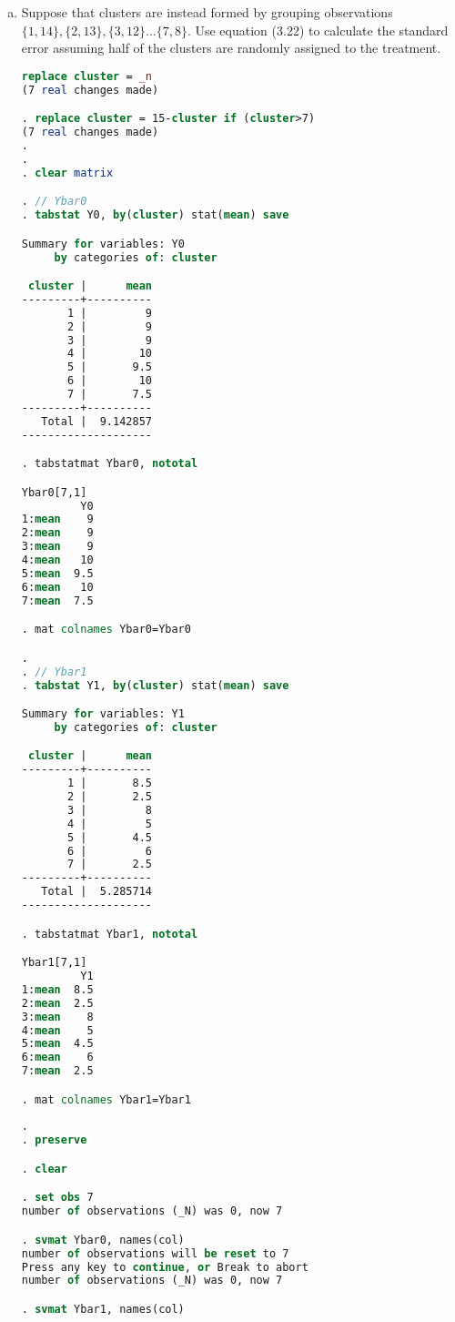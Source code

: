 \documentclass[11pt,notitlepage]{article}\usepackage[]{graphicx}\usepackage[]{color}
\begin{document}
\begin{enumerate}[a)]
\item Suppose that clusters are instead formed by grouping observations $\{1,14\},\{2,13\},\{3,12\}\ldots\{7,8\}$. Use equation (3.22) to calculate the standard error assuming half of the clusters are randomly assigned to the treatment.

\begin{lstlisting}[language=stata]
 replace cluster = _n
(7 real changes made)

. replace cluster = 15-cluster if (cluster>7)
(7 real changes made)
. 
.         
. clear matrix

. // Ybar0        
. tabstat Y0, by(cluster) stat(mean) save

Summary for variables: Y0
     by categories of: cluster 

 cluster |      mean
---------+----------
       1 |         9
       2 |         9
       3 |         9
       4 |        10
       5 |       9.5
       6 |        10
       7 |       7.5
---------+----------
   Total |  9.142857
--------------------

. tabstatmat Ybar0, nototal

Ybar0[7,1]
         Y0
1:mean    9
2:mean    9
3:mean    9
4:mean   10
5:mean  9.5
6:mean   10
7:mean  7.5

. mat colnames Ybar0=Ybar0

. 
. // Ybar1
. tabstat Y1, by(cluster) stat(mean) save

Summary for variables: Y1
     by categories of: cluster 

 cluster |      mean
---------+----------
       1 |       8.5
       2 |       2.5
       3 |         8
       4 |         5
       5 |       4.5
       6 |         6
       7 |       2.5
---------+----------
   Total |  5.285714
--------------------

. tabstatmat Ybar1, nototal

Ybar1[7,1]
         Y1
1:mean  8.5
2:mean  2.5
3:mean    8
4:mean    5
5:mean  4.5
6:mean    6
7:mean  2.5

. mat colnames Ybar1=Ybar1
        
.         
. preserve 

. clear

. set obs 7
number of observations (_N) was 0, now 7

. svmat Ybar0, names(col)
number of observations will be reset to 7
Press any key to continue, or Break to abort
number of observations (_N) was 0, now 7

. svmat Ybar1, names(col) 


\end{lstlisting}
\end{enumerate}
\end{document}
